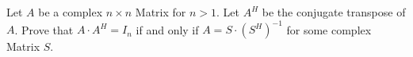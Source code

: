 Let $A$ be a complex $n \times n$ Matrix for $n >1$. Let $A^{H}$ be the conjugate transpose of $A$.
Prove that $A\cdot A^{H} =I_{n}$ if and only if $A=S\cdot (S^{H})^{-1}$ for some complex Matrix $S$.